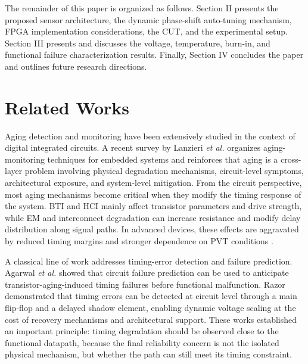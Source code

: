 \documentclass[a4paper,10pt,twoside,twocolumn,final]{JICS_LaTexGuidelines}
\begin{document}
The remainder of this paper is organized as follows. Section II presents the proposed sensor architecture, the dynamic phase-shift auto-tuning mechanism, FPGA implementation considerations, the CUT, and the experimental setup. Section III presents and discusses the voltage, temperature, burn-in, and functional failure characterization results. Finally, Section IV concludes the paper and outlines future research directions.

\section{Related Works}

Aging detection and monitoring have been extensively studied in the context of digital integrated circuits. A recent survey by Lanzieri \textit{et al.} \cite{review} organizes aging-monitoring techniques for embedded systems and reinforces that aging is a cross-layer problem involving physical degradation mechanisms, circuit-level symptoms, architectural exposure, and system-level mitigation. From the circuit perspective, most aging mechanisms become critical when they modify the timing response of the system. BTI and HCI mainly affect transistor parameters and drive strength, while EM and interconnect degradation can increase resistance and modify delay distribution along signal paths. In advanced devices, these effects are aggravated by reduced timing margins and stronger dependence on PVT conditions \cite{introduction_amouri,Pande2022EMSignalInterconnects,Li2022FPGAAgingPrediction}.

A classical line of work addresses timing-error detection and failure prediction. Agarwal \textit{et al.} \cite{agarwal2007failure} showed that circuit failure prediction can be used to anticipate transistor-aging-induced timing failures before functional malfunction. Razor \cite{Ernst2004Razor} demonstrated that timing errors can be detected at circuit level through a main flip-flop and a delayed shadow element, enabling dynamic voltage scaling at the cost of recovery mechanisms and architectural support. These works established an important principle: timing degradation should be observed close to the functional datapath, because the final reliability concern is not the isolated physical mechanism, but whether the path can still meet its timing constraint.
\end{document}
